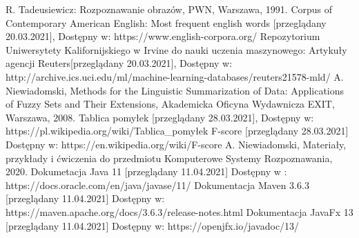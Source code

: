 \documentclass{classrep}
\begin{document}
\begin{thebibliography}{0}
 R. Tadeusiewicz: Rozpoznawanie obrazów, PWN, Warszawa, 1991.  
 Corpus of Contemporary American English: Most frequent english words [przeglądany  20.03.2021], Dostępny w: https://www.english-corpora.org/
 Repozytorium Uniwersytety Kalifornijskiego w Irvine do nauki uczenia maszynowego: Artykuły agencji Reuters[przeglądany 20.03.2021], 
Dostępny w: http://archive.ics.uci.edu/ml/machine-learning-databases/reuters21578-mld/
 A. Niewiadomski, Methods for the Linguistic Summarization of Data: Applications of Fuzzy Sets and Their Extensions, Akademicka Oficyna Wydawnicza EXIT, Warszawa, 2008.
 Tablica pomyłek [przeglądany 28.03.2021], Dostępny w: https://pl.wikipedia.org/wiki/Tablica\_pomyłek
 F-score [przeglądany 28.03.2021] Dostępny w: https://en.wikipedia.org/wiki/F-score
 A. Niewiadomski, Materiały, przykłady i ćwiczenia do przedmiotu Komputerowe Systemy Rozpoznawania, 2020.
 Dokumetacja Java 11 [przeglądany 11.04.2021] Dostępny w : https://docs.oracle.com/en/java/javase/11/
 Dokumentacja Maven 3.6.3 [przeglądany 11.04.2021] Dostępny w: https://maven.apache.org/docs/3.6.3/release-notes.html
 Dokumentacja JavaFx 13 [przeglądany 11.04.2021] Dostępny w: https://openjfx.io/javadoc/13/ 
\end{thebibliography}
\end{document}
